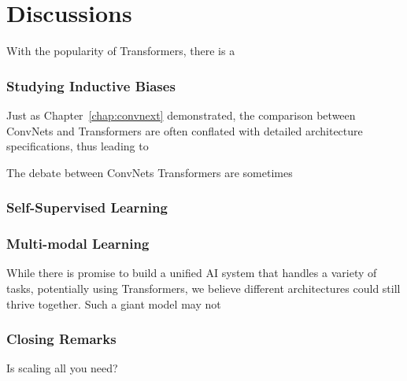 \chapter{Discussions}
With the popularity of Transformers, there is a 

\subsection{Studying Inductive Biases}
Just as Chapter~\ref{chap:convnext} demonstrated, the comparison between ConvNets and Transformers are often conflated with detailed architecture specifications, thus leading to 

The debate between ConvNets \vs Transformers are sometimes 

\subsection{Self-Supervised Learning}

\subsection{Multi-modal Learning}


While there is promise to build a unified AI system that handles a variety of tasks, potentially using Transformers, we believe different architectures could still thrive together. Such a giant model may not 


\subsection{Closing Remarks}
Is scaling all you need?



